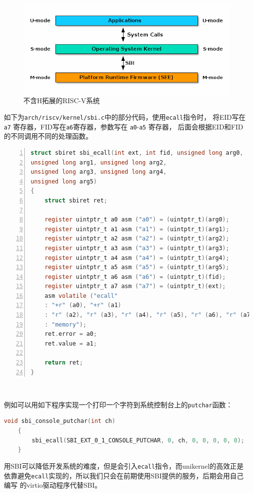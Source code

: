 \documentclass{../runikraft-report}
\begin{document}
\begin{figure}[tbh!]
\centering
\includegraphics[width=0.7\linewidth]{assets/riscv-sbi-intro1.png}
\caption{不含H拓展的RISC-V系统}
\label{fig:riscv-sbi}
\end{figure}

如下为\texttt{arch/riscv/kernel/sbi.c}中的部分代码，使用\texttt{ecall}指令时，
将EID写在\texttt{a7} 寄存器，FID写在\texttt{a6}寄存器，参数写在 \texttt{a0}-\texttt{a5} 寄存器，
后面会根据EID和FID的不同调用不同的处理函数。
\begin{lstlisting}[language=C,numbers=left]
struct sbiret sbi_ecall(int ext, int fid, unsigned long arg0,
unsigned long arg1, unsigned long arg2,
unsigned long arg3, unsigned long arg4,
unsigned long arg5)
{
	struct sbiret ret;

	register uintptr_t a0 asm ("a0") = (uintptr_t)(arg0);
	register uintptr_t a1 asm ("a1") = (uintptr_t)(arg1);
	register uintptr_t a2 asm ("a2") = (uintptr_t)(arg2);
	register uintptr_t a3 asm ("a3") = (uintptr_t)(arg3);
	register uintptr_t a4 asm ("a4") = (uintptr_t)(arg4);
	register uintptr_t a5 asm ("a5") = (uintptr_t)(arg5);
	register uintptr_t a6 asm ("a6") = (uintptr_t)(fid);
	register uintptr_t a7 asm ("a7") = (uintptr_t)(ext);
	asm volatile ("ecall"
	: "+r" (a0), "+r" (a1)
	: "r" (a2), "r" (a3), "r" (a4), "r" (a5), "r" (a6), "r" (a7)
	: "memory");
	ret.error = a0;
	ret.value = a1;

	return ret;
}
\end{lstlisting}​

例如可以用如下程序实现一个打印一个字符到系统控制台上的\texttt{putchar}函数：
\begin{lstlisting}[language=C]
    void sbi_console_putchar(int ch)
    {
    	sbi_ecall(SBI_EXT_0_1_CONSOLE_PUTCHAR, 0, ch, 0, 0, 0, 0, 0);
    }
\end{lstlisting}

用SBI可以降低开发系统的难度，但是会引入\texttt{ecall}指令，而unikernel的高效正是
依靠避免\texttt{ecall}实现的，所以我们只会在前期使用SBI提供的服务，后期会用自己编写
的virtio驱动程序代替SBI。
\end{document}
